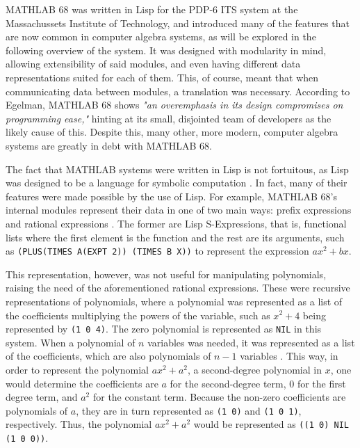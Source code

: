 MATHLAB 68 was written in Lisp for the PDP-6 ITS system at the Massachussets Institute of Technology, and introduced many of the features that are now common in computer algebra systems, as will be explored in the following overview of the system. It was designed with modularity in mind, allowing extensibility of said modules, and even having different data representations suited for each of them. This, of course, meant that when communicating data between modules, a translation was necessary. According to Egelman, MATHLAB 68 shows \textit{"an overemphasis in its design compromises on programming ease,"} \parencite{engelman1971legacy} hinting at its small, disjointed team of developers as the likely cause of this. Despite this, many other, more modern, computer algebra systems are greatly in debt with MATHLAB 68.

The fact that MATHLAB systems were written in Lisp is not fortuitous, as Lisp was designed to be a language for symbolic computation \parencite{touretzky2013common}. In fact, many of their features were made possible by the use of Lisp. For example, MATHLAB 68's internal modules represent their data in one of two main ways: prefix expressions and rational expressions \parencite{engelman1971legacy}. The former are Lisp S-Expressions, that is, functional lists where the first element is the function and the rest are its arguments, such as \verb|(PLUS(TIMES A(EXPT 2)) (TIMES B X))| to represent the expression $ax^2 + bx$.

This representation, however, was not useful for manipulating polynomials, raising the need of the aforementioned rational expressions. These were recursive representations of polynomials, where a polynomial was represented as a list of the coefficients multiplying the powers of the variable, such as $x^2 + 4$ being represented by \verb|(1 0 4)|. The zero polynomial is represented as \verb|NIL| in this system. When a polynomial of $n$ variables was needed, it was represented as a list of the coefficients, which are also polynomials of $n - 1$ variables \parencite{engelman1971legacy}. This way, in order to represent the polynomial $ax^2 + a^2$, a second-degree polynomial in $x$, one would determine the coefficients are $a$ for the second-degree term, $0$ for the first degree term, and $a^2$ for the constant term. Because the non-zero coefficients are polynomials of $a$, they are in turn represented as \verb|(1 0)| and \verb|(1 0 1)|, respectively. Thus, the polynomial $ax^2 + a^2$ would be represented as \verb|((1 0) NIL (1 0 0))|.

